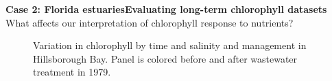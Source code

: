 \documentclass[serif]{beamer}\usepackage[]{graphicx}\usepackage[]{color}
\begin{document}
\begin{frame}{\textbf{Case 2: Florida estuaries}}{\textbf{Evaluating long-term chlorophyll datasets}}
What affects our interpretation of chlorophyll response to nutrients?
\vspace{-0.1in}
\captionsetup[subfloat]{captionskip=0pt, position=top}
\begin{figure}
\centering
{}

\leavevmode{}
    \hspace{0pt plus 1filll}\null

\caption{Variation in chlorophyll by {\color{mypal5}\protect{}} time and {\color{mypal5}\protect{}} salinity and management in Hillsborough Bay.  Panel {\color{mypal5}\protect{}} is colored before and after wastewater treatment in 1979.}
\label{fig:salmoyr}
\end{figure}
\captionsetup[subfloat]{position=top}
\end{frame}
\end{document}

